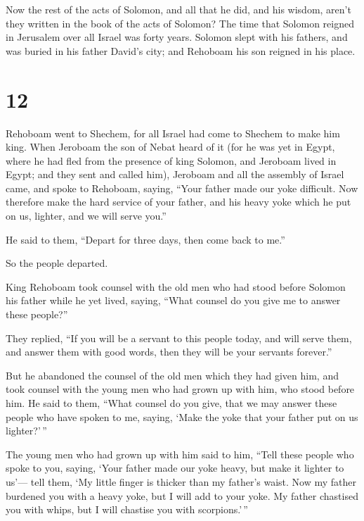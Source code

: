  Now the rest of the acts of Solomon, and all that he did,
and his wisdom, aren't they written in the book of the acts of Solomon?
 The time that Solomon reigned in Jerusalem over all Israel
was forty years.  Solomon slept with his fathers, and was
buried in his father David's city; and Rehoboam his son reigned in his
place.

\hypertarget{section-11}{%
\section{12}\label{section-11}}

 Rehoboam went to Shechem, for all Israel had come to
Shechem to make him king.  When Jeroboam the son of Nebat
heard of it (for he was yet in Egypt, where he had fled from the
presence of king Solomon, and Jeroboam lived in Egypt;  and
they sent and called him), Jeroboam and all the assembly of Israel came,
and spoke to Rehoboam, saying,  ``Your father made our yoke
difficult. Now therefore make the hard service of your father, and his
heavy yoke which he put on us, lighter, and we will serve you.''

 He said to them, ``Depart for three days, then come back to
me.''

So the people departed.

 King Rehoboam took counsel with the old men who had stood
before Solomon his father while he yet lived, saying, ``What counsel do
you give me to answer these people?''

 They replied, ``If you will be a servant to this people
today, and will serve them, and answer them with good words, then they
will be your servants forever.''

 But he abandoned the counsel of the old men which they had
given him, and took counsel with the young men who had grown up with
him, who stood before him.  He said to them, ``What counsel
do you give, that we may answer these people who have spoken to me,
saying, `Make the yoke that your father put on us lighter?'\,''

 The young men who had grown up with him said to him,
``Tell these people who spoke to you, saying, `Your father made our yoke
heavy, but make it lighter to us'--- tell them, `My little finger is
thicker than my father's waist.  Now my father burdened you
with a heavy yoke, but I will add to your yoke. My father chastised you
with whips, but I will chastise you with scorpions.'\,''

